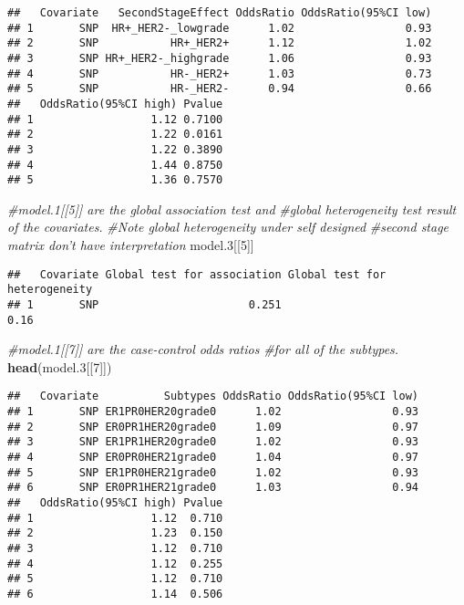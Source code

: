 \documentclass[11pt,]{article}
\newenvironment{Shaded}{\begin{snugshade}}{\end{snugshade}}
\newcommand{\CommentTok}[1]{\textcolor[rgb]{0.56,0.35,0.01}{\textit{#1}}}
\newcommand{\DecValTok}[1]{\textcolor[rgb]{0.00,0.00,0.81}{#1}}
\newcommand{\FloatTok}[1]{\textcolor[rgb]{0.00,0.00,0.81}{#1}}
\newcommand{\KeywordTok}[1]{\textcolor[rgb]{0.13,0.29,0.53}{\textbf{#1}}}
\newcommand{\NormalTok}[1]{#1}
\begin{document}
\begin{verbatim}
##   Covariate   SecondStageEffect OddsRatio OddsRatio(95%CI low)
## 1       SNP  HR+_HER2-_lowgrade      1.02                 0.93
## 2       SNP           HR+_HER2+      1.12                 1.02
## 3       SNP HR+_HER2-_highgrade      1.06                 0.93
## 4       SNP           HR-_HER2+      1.03                 0.73
## 5       SNP           HR-_HER2-      0.94                 0.66
##   OddsRatio(95%CI high) Pvalue
## 1                  1.12 0.7100
## 2                  1.22 0.0161
## 3                  1.22 0.3890
## 4                  1.44 0.8750
## 5                  1.36 0.7570
\end{verbatim}

\begin{Shaded}
\begin{Highlighting}[]
\CommentTok{#model.1[[5]] are the global association test and }
\CommentTok{#global heterogeneity test result of the covariates.}
\CommentTok{#Note global heterogeneity under self designed}
\CommentTok{#second stage matrix don't have interpretation}
\NormalTok{model}\FloatTok{.3}\NormalTok{[[}\DecValTok{5}\NormalTok{]]}
\end{Highlighting}
\end{Shaded}

\begin{verbatim}
##   Covariate Global test for association Global test for heterogeneity
## 1       SNP                       0.251                          0.16
\end{verbatim}

\begin{Shaded}
\begin{Highlighting}[]
\CommentTok{#model.1[[7]] are the case-control odds ratios }
\CommentTok{#for all of the subtypes.}
\KeywordTok{head}\NormalTok{(model}\FloatTok{.3}\NormalTok{[[}\DecValTok{7}\NormalTok{]])}
\end{Highlighting}
\end{Shaded}

\begin{verbatim}
##   Covariate          Subtypes OddsRatio OddsRatio(95%CI low)
## 1       SNP ER1PR0HER20grade0      1.02                 0.93
## 2       SNP ER0PR1HER20grade0      1.09                 0.97
## 3       SNP ER1PR1HER20grade0      1.02                 0.93
## 4       SNP ER0PR0HER21grade0      1.04                 0.97
## 5       SNP ER1PR0HER21grade0      1.02                 0.93
## 6       SNP ER0PR1HER21grade0      1.03                 0.94
##   OddsRatio(95%CI high) Pvalue
## 1                  1.12  0.710
## 2                  1.23  0.150
## 3                  1.12  0.710
## 4                  1.12  0.255
## 5                  1.12  0.710
## 6                  1.14  0.506
\end{verbatim}
\end{document}
